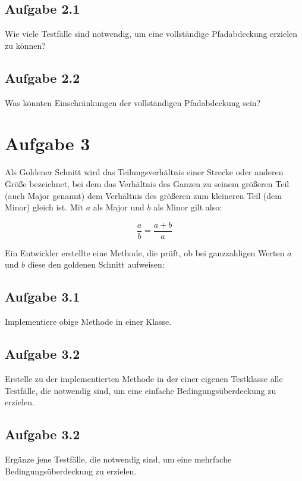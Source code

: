 \subsection*{Aufgabe 2.1}
Wie viele Testfälle sind notwendig, um eine vollständige Pfadabdeckung erzielen zu können?

\subsection*{Aufgabe 2.2}
Was könnten Einschränkungen der vollständigen Pfadabdeckung sein?

\newpage
\section*{Aufgabe 3}
Als Goldener Schnitt wird das Teilungsverhältnis einer Strecke oder anderen Größe bezeichnet, bei dem das Verhältnis des Ganzen zu seinem größeren Teil (auch Major genannt) dem Verhältnis des größeren zum kleineren Teil (dem Minor) gleich ist. Mit $a$ als Major und $b$ als Minor gilt also:

\[  
\frac{a}{b} = \frac{a + b}{a}
\]

Ein Entwickler erstellte eine Methode, die prüft, ob bei ganzzahligen Werten $a$ und $b$ diese den goldenen Schnitt aufweisen: 



\subsection*{Aufgabe 3.1}

Implementiere obige Methode in einer Klasse.

\subsection*{Aufgabe 3.2}

Erstelle zu der implementierten Methode in der einer eigenen Testklasse alle Testfälle, die notwendig sind, um eine einfache Bedingungsüberdeckung zu erzielen.

\subsection*{Aufgabe 3.2}

Ergänze jene Testfälle, die notwendig sind, um eine mehrfache Bedingungsüberdeckung zu erzielen.

